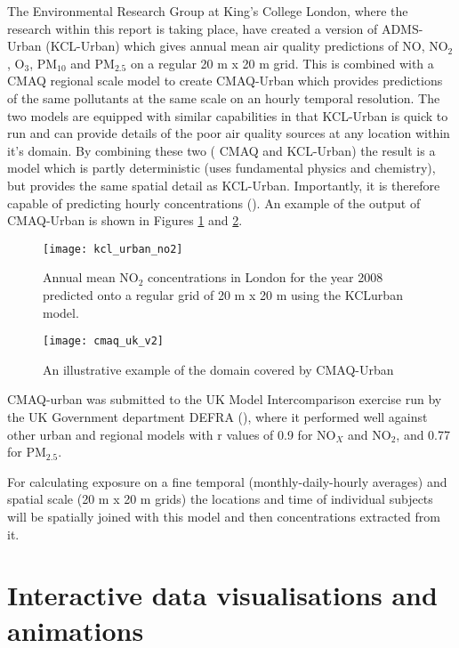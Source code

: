 The Environmental Research Group at King's College London, where the research within this report is taking place, have created a version of ADMS-Urban (KCL-Urban) which gives annual mean air quality predictions of NO, NO$_{2}$, O$_{3}$, PM$_{10}$ and PM$_{2.5}$ on a regular 20 m x 20 m grid. This is combined with a CMAQ regional scale model to create CMAQ-Urban which provides predictions of the same pollutants at the same scale on an hourly temporal resolution. The two models are equipped with similar capabilities in that KCL-Urban is quick to run and can provide details of the poor air quality sources at any location within it's domain. By combining these two ( CMAQ and KCL-Urban) the result is a model which is partly deterministic (uses fundamental physics and chemistry), but provides the same spatial detail as KCL-Urban. Importantly, it is therefore capable of predicting hourly concentrations (\cite{Beevers2013}). An example of the output of CMAQ-Urban is shown in Figures \ref{fig:kcl_urban_no2} and \ref{fig:cmaq_uk}.

\begin{figure}[H]
\centering
\texttt{[image: kcl\_urban\_no2]}
\caption{Annual mean NO$_{2}$ concentrations in London for the year 2008 predicted onto a regular grid of 20 m x 20 m using the KCLurban model.}
\label{fig:kcl_urban_no2}
\end{figure}

\begin{figure}[H]
\centering
\texttt{[image: cmaq\_uk\_v2]}
\caption{An illustrative example of the domain covered by CMAQ-Urban}
\label{fig:cmaq_uk}
\end{figure}

CMAQ-urban was submitted to the  UK Model Intercomparison exercise run by the UK Government department DEFRA (\cite{Carslaw2013}), where it performed well against other urban and regional models with r values of 0.9 for NO$_{X}$ and NO$_{2}$, and 0.77 for PM$_{2.5}$.

For calculating exposure on a fine temporal (monthly-daily-hourly averages) and spatial scale (20 m x 20 m grids) the locations and time of individual subjects will be spatially joined with this model and then concentrations extracted from it.


\section{Interactive data visualisations and animations}
\label{sec:interactivedata}

